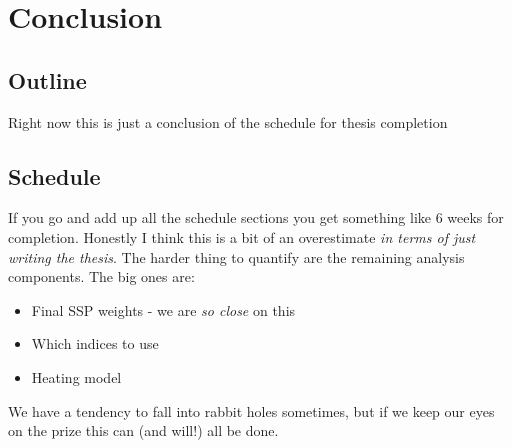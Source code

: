 \chapter[Conclusion]{Conclusion}
\label{chap:conclusion}


\clearpage
\section{Outline}
Right now this is just a conclusion of the schedule for thesis completion

\section{Schedule}
If you go and add up all the schedule sections you get something like 6 weeks
for completion. Honestly I think this is a bit of an overestimate \emph{in
  terms of just writing the thesis}. The harder thing to quantify are the
remaining analysis components. The big ones are:
\begin{itemize}
  \item Final SSP weights - we are \emph{so close} on this
  \item Which indices to use
  \item Heating model
\end{itemize}

We have a tendency to fall into rabbit holes sometimes, but if we keep our
eyes on the prize this can (and will!) all be done.

\clearpage
{} %




